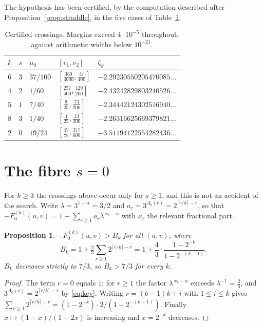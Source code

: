 \documentclass[11pt,a4paper]{article}
\theoremstyle{plain}
\newtheorem{proposition}[theorem]{Proposition}
\theoremstyle{definition}
\newcommand{\al}{\alpha}
\begin{document}
The hypothesis has been certified, by the computation described after
Proposition~\ref{prop:straddle}, in the five cases of Table~\ref{tab:family}.

\begin{table}[h]
\centering
\begin{tabular}{rrlll}
\toprule
$k$ & $s$ & $u_0$ & $[v_1,v_2]$ & $\zeta_k$\\
\midrule
$6$ & $3$ & $37/100$ & $[\tfrac{369}{4000},\tfrac{37}{400}]$ & $-2.29230550205470085\ldots$\\
$4$ & $2$ & $1/60$   & $[\tfrac{257}{400},\tfrac{129}{200}]$ & $-2.43242829803240526\ldots$\\
$5$ & $1$ & $7/40$   & $[\tfrac{9}{25},\tfrac{73}{200}]$     & $-2.34442124302516940\ldots$\\
$8$ & $3$ & $1/40$   & $[\tfrac{4}{25},\tfrac{33}{200}]$     & $-2.26316625669379821\ldots$\\
$2$ & $0$ & $19/24$  & $[\tfrac{47}{75},\tfrac{377}{600}]$   & $-3.51194122554282436\ldots$\\
\bottomrule
\end{tabular}
\caption{Certified crossings. Margins exceed $4\cdot10^{-5}$ throughout, against arithmetic widths
below $10^{-21}$.}\label{tab:family}
\end{table}

\section{The fibre \texorpdfstring{$s=0$}{s=0}}\label{sec:s0}

For $k\ge3$ the crossings above occur only for $s\ge1$, and this is not an accident of the search.
Write $\lambda=3^{1-\al}=3/2$ and $a_r=3^{A_0(r)}=2^{\lceil r/k\rceil-r}$, so that
$-F^{(k)}_0(u,v)=1+\sum_{r\ge1}a_r\lambda^{\,x_r-u}$ with $x_r$ the relevant fractional part.

\begin{proposition}\label{prop:s0}
$-F^{(k)}_0(u,v)>B_k$ for all $(u,v)$, where
\[
   B_k=1+\tfrac23\sum_{r\ge1}2^{\lceil r/k\rceil-r}=1+\frac43\cdot\frac{1-2^{-k}}{1-2^{-(k-1)}} .
\]
$B_k$ decreases strictly to $7/3$, so $B_k>7/3$ for every $k$.
\end{proposition}

\begin{proof}
The term $r=0$ equals $1$; for $r\ge1$ the factor $\lambda^{\,x_r-u}$ exceeds
$\lambda^{-1}=\tfrac23$, and $3^{A_0(r)}=2^{\lceil r/k\rceil-r}$ by \eqref{eq:key}. Writing
$r=(b-1)k+i$ with $1\le i\le k$ gives
$\sum_{r\ge1}2^{\lceil r/k\rceil-r}=(1-2^{-k})\cdot2/(1-2^{-(k-1)})$. Finally
$x\mapsto(1-x)/(1-2x)$ is increasing and $x=2^{-k}$ decreases.
\end{proof}
\end{document}
